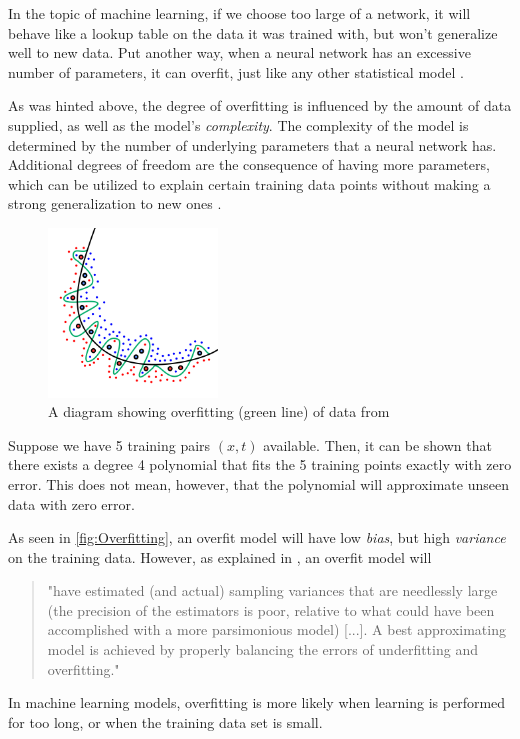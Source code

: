 \documentclass{article}
\begin{document}
In the topic of machine learning, if we choose too large of a network, it will behave like a lookup table on the data it was trained with, but won't generalize well to new data. Put another way, when a neural network has an excessive number of parameters, it can overfit, just like any other statistical model \citep{book:AIModernApp}.

As was hinted above, the degree of overfitting is influenced by the amount of data supplied, as well as the model's \textit{complexity}. The complexity of the model is determined by the number of underlying parameters that a neural network has. Additional degrees of freedom are the consequence of having more parameters, which can be utilized to explain certain training data points without making a strong generalization to new ones \citep{inbook:Aggarwal-4.1}.
\begin{figure} %
    \centering
    \includegraphics[width=0.4\textwidth]{Overfitting}
    \caption{A diagram showing overfitting (green line) of data from \citep{overfitting-img}}
    \label{fig:Overfitting}
\end{figure}
\begin{example}
  Suppose we have 5 training pairs $(x, t)$ available. Then, it can be shown that there exists a degree 4 polynomial that fits the 5 training points exactly with zero error. This does not mean, however, that the polynomial will approximate unseen data with zero error. 
\end{example}
As seen in \autoref{fig:Overfitting}, an overfit model will have low \textit{bias}, but high \textit{variance} on the training data. However, as explained in \cite{burnham2002model}, an overfit model will
\begin{quote}"have estimated (and actual) sampling variances that are needlessly large (the precision of the estimators is poor, relative to what could have been accomplished with a more parsimonious model) [...]. A best approximating model is achieved by properly balancing the errors of underfitting and overfitting." \end{quote}
\begin{remark} 
  In machine learning models, overfitting is more likely when learning is performed for too long, or when the training data set is small.
\end{remark}
\end{document}
